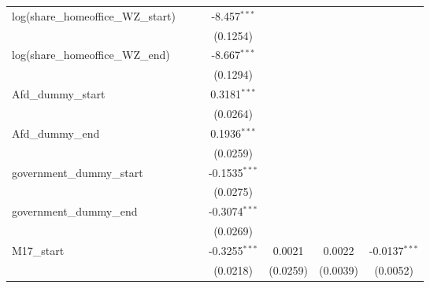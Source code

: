 \documentclass[10pt,a4paper]{article}
\begin{document}
\begin{tabular}{lcccccc}
   log(share\_homeoffice\_WZ\_start)            &                &                & -8.457$^{***}$  &                &                 &   \\   
                                                &                &                & (0.1254)        &                &                 &   \\   
   log(share\_homeoffice\_WZ\_end)              &                &                & -8.667$^{***}$  &                &                 &   \\   
                                                &                &                & (0.1294)        &                &                 &   \\   
   Afd\_dummy\_start                            &                &                & 0.3181$^{***}$  &                &                 &   \\   
                                                &                &                & (0.0264)        &                &                 &   \\     
   Afd\_dummy\_end                              &                &                & 0.1936$^{***}$  &                &                 &   \\   
                                                &                &                & (0.0259)        &                &                 &   \\  
   government\_dummy\_start                     &                &                & -0.1535$^{***}$ &                &                 &   \\   
                                                &                &                & (0.0275)        &                &                 &   \\   
   government\_dummy\_end                       &                &                & -0.3074$^{***}$ &                &                 &   \\   
                                                &                &                & (0.0269)        &                &                 &   \\    
   \midrule
   M17\_start                                   &                &                & -0.3255$^{***}$ & 0.0021         & 0.0022          & -0.0137$^{***}$\\   
                                                &                &                & (0.0218)        & (0.0259)       & (0.0039)        & (0.0052)\\   

\end{tabular}
\end{document}
